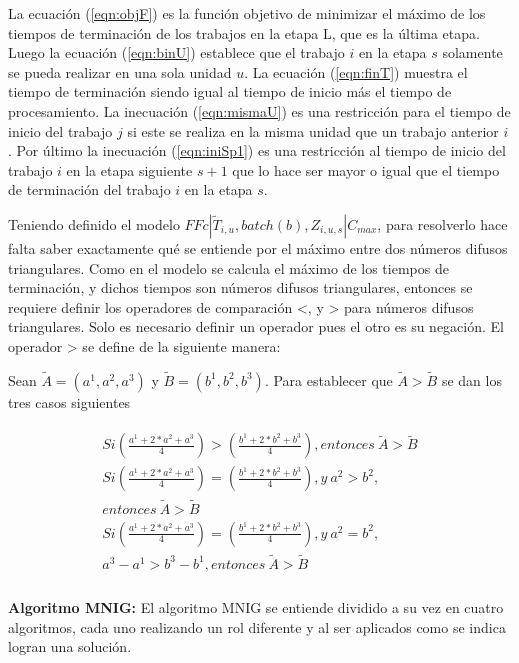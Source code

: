 \documentclass{article}
\def\notac_modelo{$FFc | \tilde{T}_{i, u}, batch(b), Z_{i, u, s} | C_{max}$}
\begin{document}
La ecuación (\ref{eqn:objF}) es la función objetivo de minimizar el máximo de los tiempos de terminación de los trabajos en la etapa L, que es la última etapa. Luego la ecuación (\ref{eqn:binU}) establece que el trabajo $i$ en la etapa $s$ solamente se pueda realizar en una sola unidad $u$. La ecuación (\ref{eqn:finT}) muestra el tiempo de terminación siendo igual al tiempo de inicio más el tiempo de procesamiento. La inecuación (\ref{eqn:mismaU}) es una restricción para el tiempo de inicio del trabajo $j$ si este se realiza en la misma unidad que un trabajo anterior $i$. Por último la inecuación (\ref{eqn:iniSp1}) es una restricción al tiempo de inicio del trabajo $i$ en la etapa siguiente $s+1$ que lo hace ser mayor o igual que el tiempo de terminación del trabajo $i$ en la etapa $s$. \autocite{modFMMSP}

\vspace{\baselineskip}
Teniendo definido el modelo \notac_modelo, para resolverlo hace falta saber exactamente qué se entiende por el máximo entre dos números difusos triangulares. Como en el modelo se calcula el máximo de los tiempos de terminación, y dichos tiempos son números difusos triangulares, entonces se requiere definir los operadores de comparación <, y > para números difusos triangulares. Solo es necesario definir un operador pues el otro es su negación. El operador > se define de la siguiente manera: \autocite{modFMMSP}

\vspace{\baselineskip}
Sean $\tilde{A} = (a^1,a^2,a^3)$ y $\tilde{B} = (b^1,b^2,b^3)$. Para establecer que $\tilde{A} > \tilde{B}$ se dan los tres casos siguientes

\begin{align}
\begin{split}
    Si \left(\frac{a^1+2*a^2+a^3}{4}\right) > 
    \left(\frac{b^1+2*b^2+b^3}{4}\right), entonces\ \tilde{A} > \tilde{B}\\
    Si \left(\frac{a^1+2*a^2+a^3}{4}\right) = \left(\frac{b^1+2*b^2+b^3}{4}\right),
    y\ a^2 > b^2,\\ entonces\ \tilde{A} > \tilde{B}\\
    Si \left(\frac{a^1+2*a^2+a^3}{4}\right) = \left(\frac{b^1+2*b^2+b^3}{4}\right),
    y\ a^2 = b^2,\\ a^3-a^1 > b^3-b^1, entonces\ \tilde{A} > \tilde{B}\\
\end{split}
\end{align}

\vspace{\baselineskip}
\textbf{Algoritmo MNIG:} El algoritmo MNIG se entiende dividido a su vez en cuatro algoritmos, cada uno realizando un rol diferente y al ser aplicados como se indica logran una solución. \autocite{algMNIG}
\end{document}
